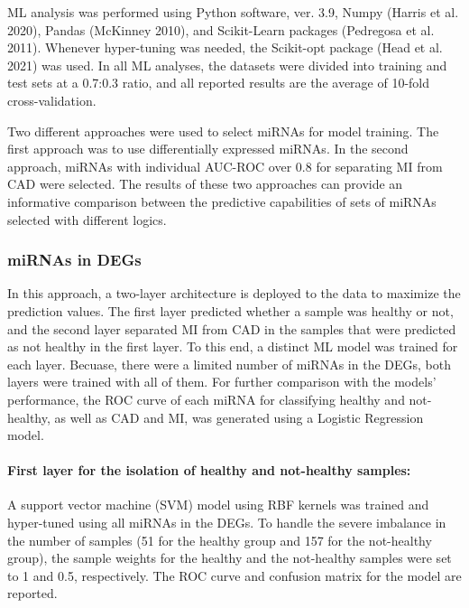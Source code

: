 \documentclass[
]{article}
\begin{document}
ML analysis was performed using Python software, ver. 3.9, Numpy (Harris
et al. 2020), Pandas (McKinney 2010), and Scikit-Learn packages
(Pedregosa et al. 2011). Whenever hyper-tuning was needed, the
Scikit-opt package (Head et al. 2021) was used. In all ML analyses, the
datasets were divided into training and test sets at a 0.7:0.3 ratio,
and all reported results are the average of 10-fold cross-validation.

Two different approaches were used to select miRNAs for model training.
The first approach was to use differentially expressed miRNAs. In the
second approach, miRNAs with individual AUC-ROC over 0.8 for separating
MI from CAD were selected. The results of these two approaches can
provide an informative comparison between the predictive capabilities of
sets of miRNAs selected with different logics.

\hypertarget{mirnas-in-degs}{%
\subsubsection{miRNAs in DEGs}\label{mirnas-in-degs}}

In this approach, a two-layer architecture is deployed to the data to
maximize the prediction values. The first layer predicted whether a
sample was healthy or not, and the second layer separated MI from CAD in
the samples that were predicted as not healthy in the first layer. To
this end, a distinct ML model was trained for each layer. Becuase, there
were a limited number of miRNAs in the DEGs, both layers were trained
with all of them. For further comparison with the models' performance,
the ROC curve of each miRNA for classifying healthy and not-healthy, as
well as CAD and MI, was generated using a Logistic Regression model.

\hypertarget{first-layer-for-the-isolation-of-healthy-and-not-healthy-samples}{%
\paragraph{First layer for the isolation of healthy and not-healthy
samples:}\label{first-layer-for-the-isolation-of-healthy-and-not-healthy-samples}}

A support vector machine (SVM) model using RBF kernels was trained and
hyper-tuned using all miRNAs in the DEGs. To handle the severe imbalance
in the number of samples (51 for the healthy group and 157 for the
not-healthy group), the sample weights for the healthy and the
not-healthy samples were set to 1 and 0.5, respectively. The ROC curve
and confusion matrix for the model are reported.
\end{document}
